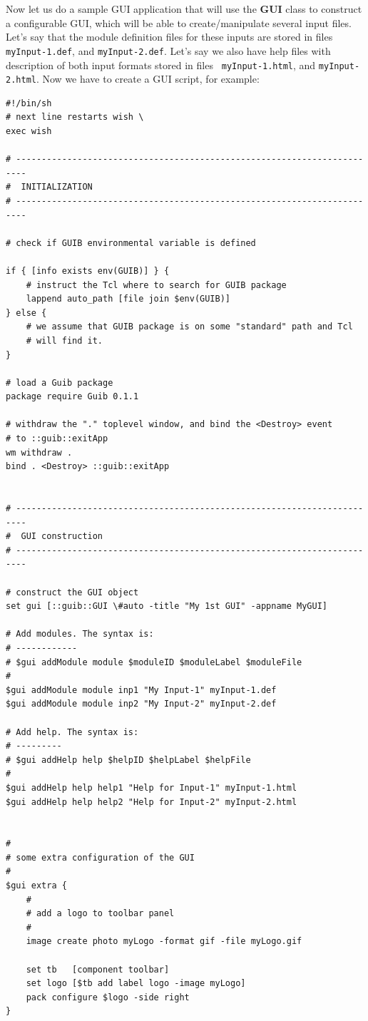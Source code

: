 \documentclass[12pt]{article}
\def\key#1{{\bf #1}}
\begin{document}
Now let us do a sample GUI application that will use the \key{GUI}
class to construct a configurable GUI, which will be able to
create/manipulate several input files. Let's say that the module
definition files for these inputs are stored in files {\tt
  myInput-1.def}, and {\tt myInput-2.def}. Let's say we also have help
files with description of both input formats stored in files {\tt
  myInput-1.html}, and {\tt myInput-2.html}. Now we have to create a
GUI script, for example:

{\footnotesize
\begin{verbatim}
#!/bin/sh
# next line restarts wish \
exec wish

# ------------------------------------------------------------------------
#  INITIALIZATION
# ------------------------------------------------------------------------

# check if GUIB environmental variable is defined

if { [info exists env(GUIB)] } {
    # instruct the Tcl where to search for GUIB package
    lappend auto_path [file join $env(GUIB)]
} else {
    # we assume that GUIB package is on some "standard" path and Tcl
    # will find it.
}

# load a Guib package
package require Guib 0.1.1

# withdraw the "." toplevel window, and bind the <Destroy> event
# to ::guib::exitApp
wm withdraw .
bind . <Destroy> ::guib::exitApp


# ------------------------------------------------------------------------
#  GUI construction
# ------------------------------------------------------------------------

# construct the GUI object
set gui [::guib::GUI \#auto -title "My 1st GUI" -appname MyGUI]

# Add modules. The syntax is:
# ------------
# $gui addModule module $moduleID $moduleLabel $moduleFile
#
$gui addModule module inp1 "My Input-1" myInput-1.def
$gui addModule module inp2 "My Input-2" myInput-2.def

# Add help. The syntax is:
# ---------
# $gui addHelp help $helpID $helpLabel $helpFile
#
$gui addHelp help help1 "Help for Input-1" myInput-1.html
$gui addHelp help help2 "Help for Input-2" myInput-2.html


#
# some extra configuration of the GUI
#
$gui extra {
    #
    # add a logo to toolbar panel
    #
    image create photo myLogo -format gif -file myLogo.gif

    set tb   [component toolbar]
    set logo [$tb add label logo -image myLogo]
    pack configure $logo -side right
}
\end{verbatim}
}
\end{document}
